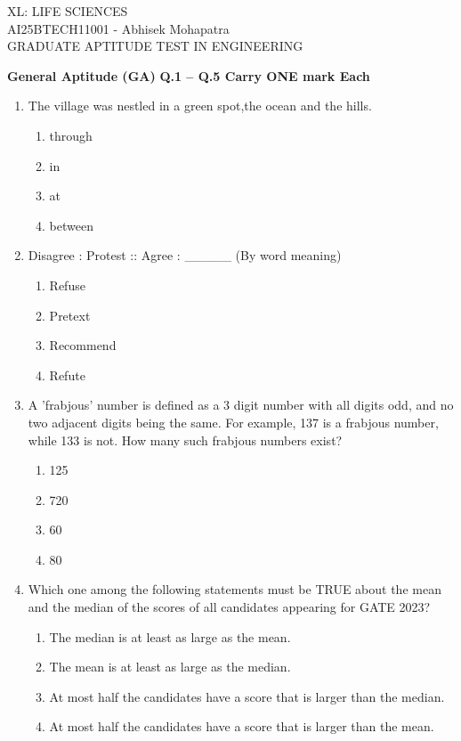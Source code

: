 \documentclass[journal,12pt,onecolumn]{IEEEtran}
\begin{document}
\clearpage
\begin{center}
    \huge{XL: LIFE SCIENCES}\\
    \large{AI25BTECH11001 - Abhisek Mohapatra}\\
    \large{GRADUATE APTITUDE TEST IN ENGINEERING}
\end{center}

\textbf{General Aptitude (GA)}
\textbf{Q.1 -- Q.5 Carry ONE mark Each}

\begin{enumerate}
	\item{ The village was nestled in a green spot,the ocean and the hills.}
    \begin{enumerate}
        \item through
        \item in
        \item at
        \item between
    \end{enumerate}

    \item Disagree : Protest :: Agree : \_\_\_\_\_ (By word meaning)
    \begin{enumerate}
        \item Refuse
        \item Pretext
        \item Recommend
        \item Refute
    \end{enumerate}

    \item A 'frabjous' number is defined as a 3 digit number with all digits odd, and no two adjacent digits being the same. For example, 137 is a frabjous number, while 133 is not. How many such frabjous numbers exist?
    \begin{enumerate}
        \item 125
        \item 720
        \item 60
        \item 80
    \end{enumerate}

    \item Which one among the following statements must be TRUE about the mean and the median of the scores of all candidates appearing for GATE 2023?
    \begin{enumerate}
        \item The median is at least as large as the mean.
        \item The mean is at least as large as the median.
        \item At most half the candidates have a score that is larger than the median.
        \item At most half the candidates have a score that is larger than the mean.
    \end{enumerate}


\end{enumerate}
\end{document}
